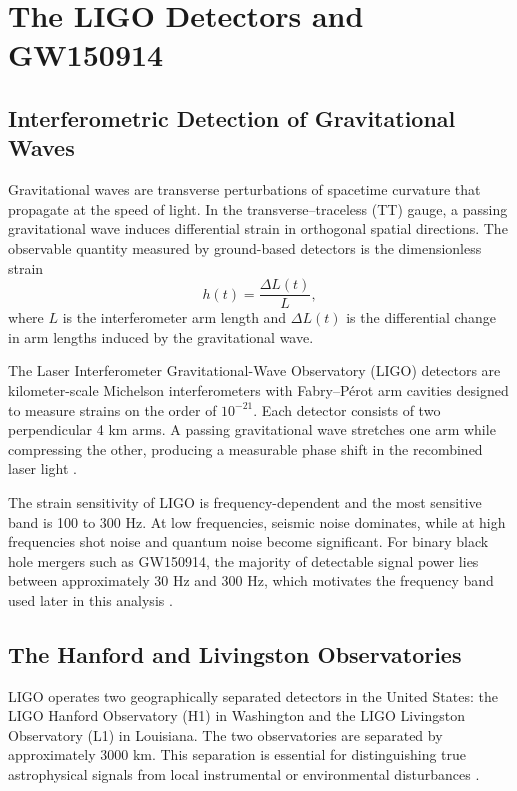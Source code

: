 \section{The LIGO Detectors and GW150914} \label{sec:2}
\subsection{Interferometric Detection of Gravitational Waves}

Gravitational waves are transverse perturbations of spacetime curvature that propagate at the speed of light. In the transverse–traceless (TT) gauge, a passing gravitational wave induces differential strain in orthogonal spatial directions. The observable quantity measured by ground-based detectors is the dimensionless strain
\begin{equation}
	h(t) = \frac{\Delta L(t)}{L},
\end{equation}
where $L$ is the interferometer arm length and $\Delta L(t)$ is the differential change in arm lengths induced by the gravitational wave\cite{Abbott2016Discovery}.

The Laser Interferometer Gravitational-Wave Observatory (LIGO) detectors are kilometer-scale Michelson interferometers with Fabry–Pérot arm cavities designed to measure strains on the order of $10^{-21}$. Each detector consists of two perpendicular 4 km arms. A passing gravitational wave stretches one arm while compressing the other, producing a measurable phase shift in the recombined laser light
\cite{Abbott2016Discovery}.

The strain sensitivity of LIGO is frequency-dependent and the most sensitive band is 100 to 300 Hz. At low frequencies, seismic noise dominates, while at high frequencies shot noise and quantum noise become significant. For binary black hole mergers such as GW150914, the majority of detectable signal power lies between approximately 30 Hz and 300 Hz, which motivates the frequency band used later in this analysis
\cite{Aasi2015AdvancedLIGO,Abbott2016Discovery}.
\subsection{The Hanford and Livingston Observatories}

LIGO operates two geographically separated detectors in the United States: the LIGO Hanford Observatory (H1) in Washington and the LIGO Livingston Observatory (L1) in Louisiana. The two observatories are separated by approximately 3000 km. This separation is essential for distinguishing true astrophysical signals from local instrumental or environmental disturbances \cite{Abbott2016Properties}.

